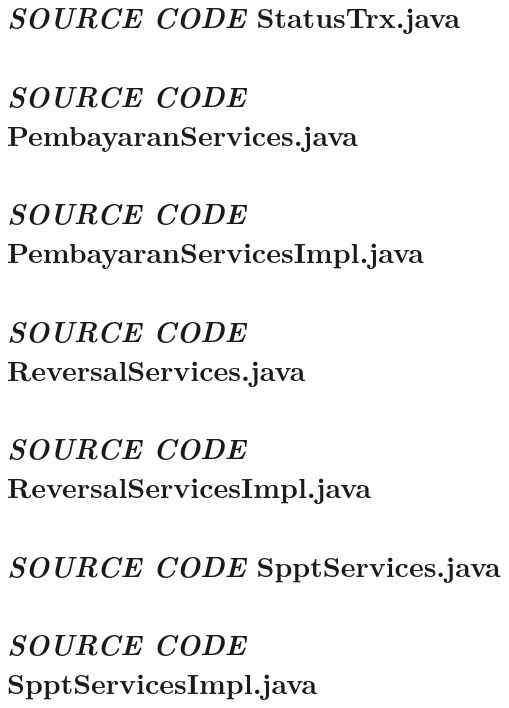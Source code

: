 \documentclass[pdftex,12pt, oneside]{article}
\begin{document}
\section{\textit{SOURCE CODE} StatusTrx.java}


\section{\textit{SOURCE CODE} PembayaranServices.java}


\section{\textit{SOURCE CODE} PembayaranServicesImpl.java}


\section{\textit{SOURCE CODE} ReversalServices.java}


\section{\textit{SOURCE CODE} ReversalServicesImpl.java}


\section{\textit{SOURCE CODE} SpptServices.java}


\section{\textit{SOURCE CODE} SpptServicesImpl.java}
\end{document}
